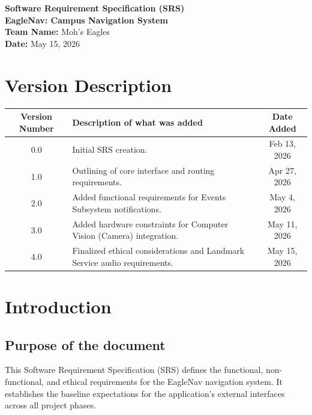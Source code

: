 \documentclass[12pt]{article}
\begin{document}
\begin{titlepage}
    \centering
    \vspace*{2in}
    {\Huge \textbf{Software Requirement Specification (SRS)}}\\[1cm]
    {\Large \textbf{EagleNav: Campus Navigation System}}\\[2cm]
    {\large \textbf{Team Name:} Moh's Eagles}\\[0.5cm]
    {\large \textbf{Date:} May 15, 2026}\\[2cm]
    \vfill
\end{titlepage}

\tableofcontents
\newpage

\section*{Version Description}
\begin{table}[h]
    \centering
    \begin{tabularx}{\textwidth}{|c|X|c|}
        \hline
        \textbf{Version Number} & \textbf{Description of what was added} & \textbf{Date Added} \\ \hline
        0.0 & Initial SRS creation. & Feb 13, 2026\\ \hline
        1.0 & Outlining of core interface and routing requirements. & Apr 27, 2026 \\ \hline
        2.0 & Added functional requirements for Events Subsystem notifications. & May 4, 2026 \\ \hline
        3.0 & Added hardware constraints for Computer Vision (Camera) integration. & May 11, 2026 \\ \hline
        4.0 & Finalized ethical considerations and Landmark Service audio requirements. & May 15, 2026 \\ \hline
    \end{tabularx}
\end{table}

\newpage


\section{Introduction}

\subsection{Purpose of the document}
This Software Requirement Specification (SRS) defines the functional, non-functional, and ethical requirements for the EagleNav navigation system. It establishes the baseline expectations for the application's external interfaces across all project phases.
\end{document}
